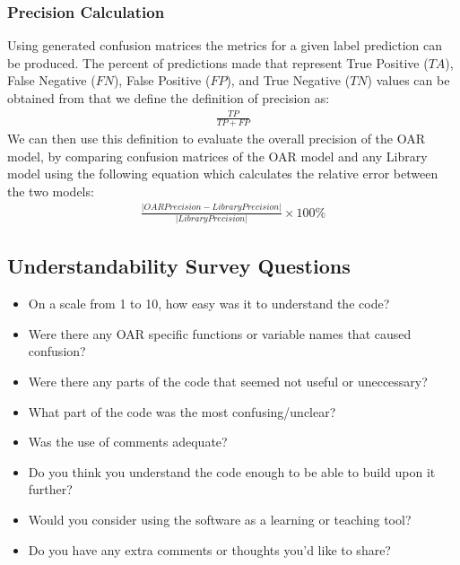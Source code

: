 \documentclass[12pt, titlepage]{article}
\begin{document}
\subsubsection{Precision Calculation} \label{precision_calc}

Using generated confusion matrices the metrics for a given label prediction can be produced. The percent of predictions made
that represent True Positive ($\mathit{TA}$), False Negative ($\mathit{FN}$), False Positive ($\mathit{FP}$), and True Negative ($\mathit{TN}$) values can be obtained 
from that we define the definition of precision as:
\begin{gather}
\frac{\mathit{TP}}{\mathit{TP} + \mathit{FP}}
\end{gather}
We can then use this definition to evaluate the overall precision of the OAR model, by comparing confusion matrices of the OAR model 
and any Library model using the following equation which calculates the relative error between the two models:
\begin{gather}
\frac{|\mathit{OAR Precision} - \mathit{Library Precision}|}{|\mathit{Library Precision}|} \times 100\%
\end{gather}
    
\subsection{Understandability Survey Questions} \label{survey_understand}

\begin{itemize}
  \item{On a scale from 1 to 10, how easy was it to understand the code?}
  \item{Were there any OAR specific functions or variable names that caused confusion?}
  \item{Were there any parts of the code that seemed not useful or uneccessary?}
  \item{What part of the code was the most confusing/unclear?}
  \item{Was the use of comments adequate?}
  \item{Do you think you understand the code enough to be able to build upon it further?}
  \item{Would you consider using the software as a learning or teaching tool?}
  \item{Do you have any extra comments or thoughts you'd like to share?}
\end{itemize}
\end{document}
